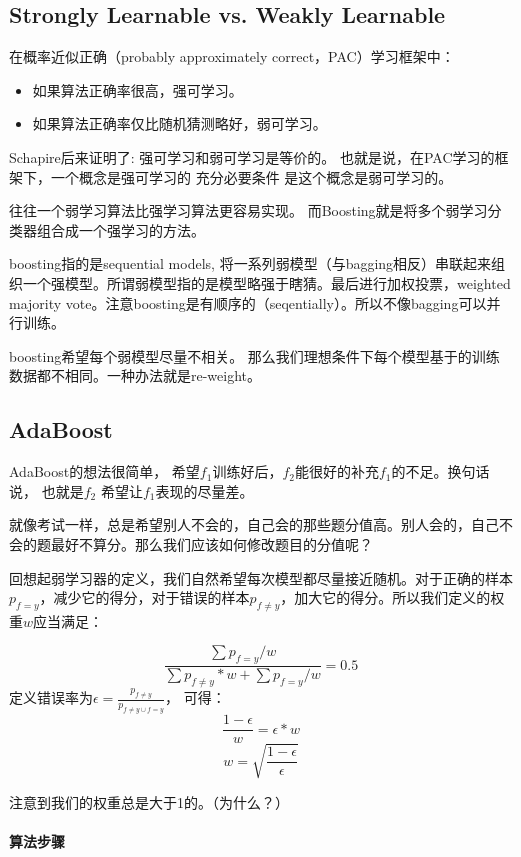 \documentclass[12pt,a4paper,oneside]{article}
\begin{document}
\begin{CJK*}{UTF8}{gbsn}
\subsection{Strongly Learnable vs. Weakly Learnable}
在概率近似正确（probably approximately correct，PAC）学习框架中：
\begin{itemize}
\item 如果算法正确率很高，强可学习。
\item 如果算法正确率仅比随机猜测略好，弱可学习。
\end{itemize}

Schapire后来证明了: 强可学习和弱可学习是等价的。 也就是说，在PAC学习的框架下，一个概念是强可学习的 充分必要条件 是这个概念是弱可学习的。

往往一个弱学习算法比强学习算法更容易实现。 而Boosting就是将多个弱学习分类器组合成一个强学习的方法。

boosting指的是sequential models, 将一系列弱模型（与bagging相反）串联起来组织一个强模型。所谓弱模型指的是模型略强于瞎猜。最后进行加权投票，weighted majority vote。注意boosting是有顺序的（seqentially）。所以不像bagging可以并行训练。

boosting希望每个弱模型尽量不相关。 那么我们理想条件下每个模型基于的训练数据都不相同。一种办法就是re-weight。

\subsection{AdaBoost}
AdaBoost的想法很简单， 希望$f_{1}$训练好后，$f_{2}$能很好的补充$f_{1}$的不足。换句话说， 也就是$f_{2}$ 希望让$f_{1}$表现的尽量差。

就像考试一样，总是希望别人不会的，自己会的那些题分值高。别人会的，自己不会的题最好不算分。那么我们应该如何修改题目的分值呢？

回想起弱学习器的定义，我们自然希望每次模型都尽量接近随机。对于正确的样本$p_{f=y}$，减少它的得分，对于错误的样本$p_{f\neq y }$，加大它的得分。所以我们定义的权重$w$应当满足：

$$\frac{\sum p_{f= y} / w}{\sum p_{f\neq y } * w+ \sum p_{f=y } / w} =0.5$$
定义错误率为$\epsilon= \frac{p_{f\neq y}}{p_{f\neq y \cup f=y}}$， 可得：
$$ \frac{1-\epsilon}{w} = \epsilon * w $$
$$w = \sqrt{\frac{1-\epsilon}{\epsilon}}$$

注意到我们的权重总是大于1的。（为什么？）

\paragraph{算法步骤}


\end{CJK*}
\end{document}
